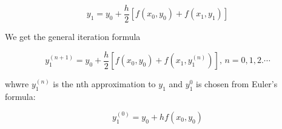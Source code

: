 \documentclass[10pt,a4paper]{article}
\begin{document}
\begin{equation}
    y_{1} = y_{0} + \frac{h}{2} [ f(x_{0},y_{0}) + f(x_{1},y_{1})]
\end{equation}

We get the general iteration formula

\begin{equation}
    y_{1}^{(n+1)} = y_{0} + \frac{h}{2} [ f(x_{0},y_{0}) + f(x_{1},y_{1}^{(n)})], \, n = 0,1,2.\cdots
\end{equation}

whwre $y_{1}^{(n)}$ is the nth approximation to $y_{1}$ and $y_{1}^{0}$
is chosen from Euler's formula:

\begin{equation}
    y^{(0)}_{1} = y_{0} + h f(x_{0},y_{0})
\end{equation}
\end{document}
